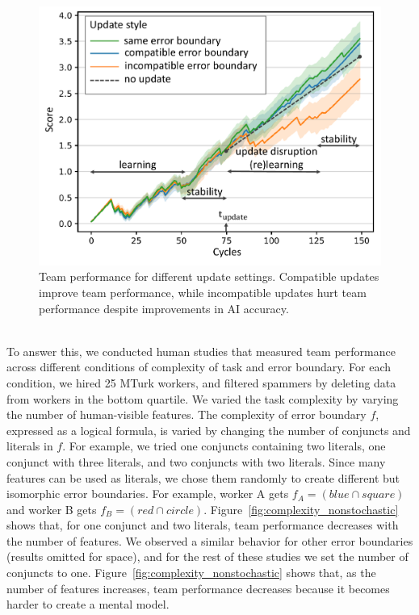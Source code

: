 \documentclass[letterpaper]{article}
\begin{document}
\begin{figure}[t]
  \centering
    \includegraphics[width=\columnwidth]{update_study.pdf}
    \caption{Team performance for different update settings. Compatible updates improve team performance, while incompatible updates hurt team performance  despite improvements in AI accuracy.}
    \label{fig:updateExp}
\end{figure}

\\
\noindent To answer this, we conducted human studies that measured team performance across different conditions of complexity of task and error boundary.
For each condition, we hired 25 MTurk workers, and filtered spammers by deleting data from workers in the bottom quartile.  
We varied the task complexity by varying the number of human-visible features. The complexity of error boundary $f$, expressed as a logical formula, is varied by changing the number of conjuncts and literals in $f$. For example, we tried one conjuncts containing two literals, one conjunct with three literals, and two conjuncts with two literals. 
Since many features can be used as literals,  we chose them randomly to create different but isomorphic error boundaries. For example, worker A gets $f_A = (blue \cap square)$ and worker B gets $f_B = (red \cap circle)$.
Figure~\ref{fig:complexity_nonstochastic} shows that, for one conjunct and two literals, team performance decreases with the number of features. We observed a similar behavior for other error boundaries (results omitted for space), and for the rest of these studies we set the number of conjuncts to one.
 Figure~\ref{fig:complexity_nonstochastic} shows that, as the number of features increases, team performance decreases because it becomes harder to create a mental model.
\end{document}
